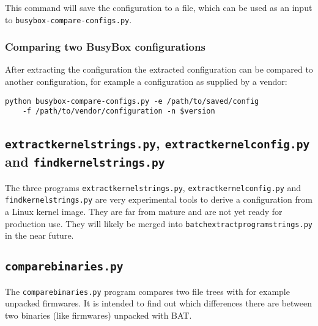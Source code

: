 \documentclass[10pt]{article}
\begin{document}
This command will save the configuration to a file, which can be used as an
input to \texttt{busybox-compare-configs.py}.

\subsubsection{Comparing two BusyBox configurations}

After extracting the configuration the extracted configuration can be compared
to another configuration, for example a configuration as supplied by a vendor:

\begin{verbatim}
python busybox-compare-configs.py -e /path/to/saved/config
    -f /path/to/vendor/configuration -n $version
\end{verbatim}

\subsection{\texttt{extractkernelstrings.py}, \texttt{extractkernelconfig.py}
\\and \texttt{findkernelstrings.py}}

The three programs \texttt{extractkernelstrings.py},
\texttt{extractkernelconfig.py} and \texttt{findkernelstrings.py} are very
experimental tools to derive a configuration from a Linux kernel image. They
are far from mature and are not yet ready for production use. They will likely
be merged into \texttt{batchextractprogramstrings.py} in the near future.


\subsection{\texttt{comparebinaries.py}}

The \texttt{comparebinaries.py} program compares two file trees with for example
unpacked firmwares. It is intended to find out which differences there are
between two binaries (like firmwares) unpacked with BAT.
\end{document}
